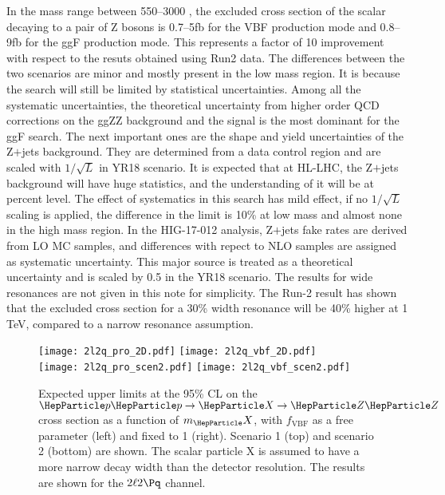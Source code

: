 In the mass range between 550--3000 \UGeV, the excluded cross section of the scalar decaying to a pair of Z bosons is 0.7--5\unit{fb} for the VBF production mode and 0.8--9\unit{fb} for the ggF production mode. This represents a factor of 10 improvement with respect to the resuts obtained using Run2 data. The differences between the two scenarios are minor and mostly present in the low mass region. It is because the search will still be limited by statistical uncertainties. Among all the systematic uncertainties, the theoretical uncertainty from higher order QCD corrections on the ggZZ background and the signal is the most dominant for the ggF search. The next important ones are the shape and yield uncertainties of the Z$+$jets background. They are determined from a data control region and are scaled with $1/\sqrt{L}$ in YR18 scenario. It is expected that at HL-LHC, the Z$+$jets background will have huge statistics, and the understanding of it will be at percent level. The effect of systematics in this search has mild effect, if no $1/\sqrt{L}$ scaling is applied, the difference in the limit is 10\% at low mass and almost none in the high mass region. In the HIG-17-012 analysis, Z$+$jets fake rates are derived from LO MC samples, and differences with repect to NLO samples are assigned as systematic uncertainty. This major source is treated as a theoretical uncertainty and is scaled by 0.5 in the YR18 scenario. 
The results for wide resonances are not given in this note for simplicity. The Run-2 result has shown that the excluded cross section for a 30\% width resonance will be 40\% higher at 1 TeV, compared to a narrow resonance assumption. 

\begin{figure}[htbp]
        \centering
        \texttt{[image: 2l2q\_pro\_2D.pdf]}
        \texttt{[image: 2l2q\_vbf\_2D.pdf]}\\
        \texttt{[image: 2l2q\_pro\_scen2.pdf]}
        \texttt{[image: 2l2q\_vbf\_scen2.pdf]}
        \caption{
                Expected upper limits at the 95\% CL on the $\Pp\Pp\to\PX\to\PZ\PZ$ cross section as a function of $m_\PX$, with $f_{\mathrm{VBF}}$ as a free parameter (left) and fixed to 1 (right). Scenario 1 (top) and scenario 2 (bottom) are shown. The scalar particle X is assumed to have a more narrow decay width than the detector resolution. The results are shown for the $2\ell2\Pq$ channel. 
                        \label{fig:combinedresult}
                }
\end{figure}